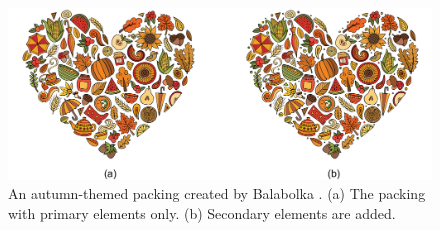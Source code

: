 \begin{figure}
\centering
\includegraphics[width=1.0\textwidth]{figures/intro/primary_secondary.pdf}
\caption[Primary and secondary elements]{
  \label{fig_primary_secondary}
  \newtext
  {
  An autumn-themed packing created by Balabolka .}
  (a) The packing with primary elements only.
  (b) Secondary elements are added. 
}
\end{figure}



